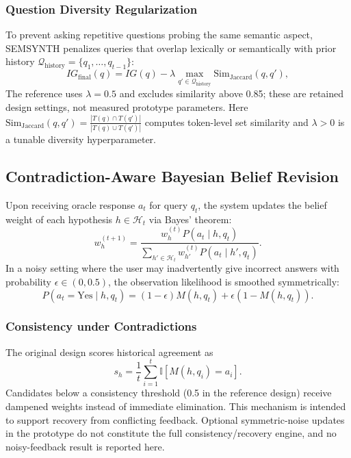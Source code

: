 \subsubsection{Question Diversity Regularization}
To prevent asking repetitive questions probing the same semantic aspect, SEMSYNTH penalizes queries that overlap lexically or semantically with prior history $\mathcal{Q}_{\text{history}} = \{q_1, \dots, q_{t-1}\}$:
\begin{equation}\label{eq:ig_final}
    IG_{\text{final}}(q) = IG(q) - \lambda \max_{q' \in \mathcal{Q}_{\text{history}}} \text{Sim}_{\text{Jaccard}}(q, q'),
\end{equation}
The reference uses $\lambda=0.5$ and excludes similarity above 0.85; these are retained design settings, not measured prototype parameters. Here $\text{Sim}_{\text{Jaccard}}(q, q') = \frac{|T(q) \cap T(q')|}{|T(q) \cup T(q')|}$ computes token-level set similarity and $\lambda > 0$ is a tunable diversity hyperparameter.

\subsection{Contradiction-Aware Bayesian Belief Revision}\label{sec:method:belief}

Upon receiving oracle response $a_t$ for query $q_t$, the system updates the belief weight of each hypothesis $h \in \mathcal{H}_t$ via Bayes' theorem:
\begin{equation}\label{eq:bayes_update}
    w_h^{(t+1)} = \frac{w_h^{(t)} P(a_t \mid h, q_t)}{\sum_{h' \in \mathcal{H}_t} w_{h'}^{(t)} P(a_t \mid h', q_t)}.
\end{equation}
In a noisy setting where the user may inadvertently give incorrect answers with probability $\epsilon \in (0, 0.5)$, the observation likelihood is smoothed symmetrically:
\begin{equation}
    P(a_t = \text{Yes} \mid h, q_t) = (1 - \epsilon) M(h, q_t) + \epsilon (1 - M(h, q_t)).
\end{equation}

\subsubsection{Consistency under Contradictions}
The original design scores historical agreement as
\begin{equation}
 s_h=\frac{1}{t}\sum_{i=1}^{t}\mathbb{I}[M(h,q_i)=a_i].
\end{equation}
Candidates below a consistency threshold (0.5 in the reference design) receive dampened weights instead of immediate elimination. This mechanism is intended to support recovery from conflicting feedback. Optional symmetric-noise updates in the prototype do not constitute the full consistency/recovery engine, and no noisy-feedback result is reported here.

